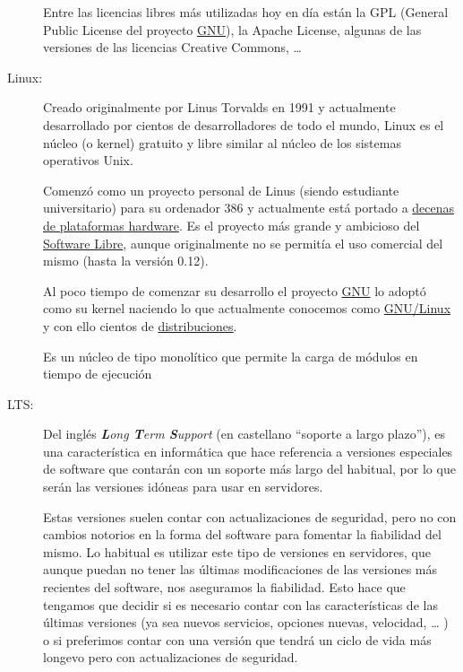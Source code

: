 \begin{description}
    Entre las licencias libres más utilizadas hoy en día están la GPL (General Public License del proyecto \hyperlink{gnu}{GNU}), la Apache License, algunas de las versiones de las licencias Creative Commons, …


    \hypertarget{linux}{}
    \item[Linux:] Creado originalmente por Linus Torvalds en 1991 y actualmente desarrollado por cientos de desarrolladores de todo el mundo, Linux es el núcleo (o kernel) gratuito y libre similar al núcleo de los sistemas operativos Unix.

    Comenzó como un proyecto personal de Linus (siendo estudiante universitario) para su ordenador 386 y actualmente está portado a \href{https://es.wikipedia.org/wiki/Portabilidad\_del\_n\%C3\%BAcleo\_Linux\_y\_arquitecturas\_soportadas}{decenas de plataformas hardware}. Es el proyecto más grande y ambicioso del \hyperlink{software_libre}{Software Libre}, aunque originalmente no se permitía el uso comercial del mismo (hasta la versión 0.12).

    Al poco tiempo de comenzar su desarrollo el proyecto \hyperlink{gnu}{GNU} lo adoptó como su kernel naciendo lo que actualmente conocemos como \hyperlink{gnu_linux}{GNU/Linux} y con ello cientos de \hyperlink{distribucion_gnu_linux}{distribuciones}.

    Es un núcleo de tipo monolítico que permite la carga de módulos en tiempo de ejecución


    \hypertarget{lts}{}
    \item[LTS:] Del inglés \textit{\textbf{L}ong \textbf{T}erm \textbf{S}upport} (en castellano “soporte a largo plazo”), es una característica en informática que hace referencia a versiones especiales de software que contarán con un soporte más largo del habitual, por lo que serán las versiones idóneas para usar en servidores.

    Estas versiones suelen contar con actualizaciones de seguridad, pero no con cambios notorios en la forma del software para fomentar la fiabilidad del mismo. Lo habitual es utilizar este tipo de versiones en servidores, que aunque puedan no tener las últimas modificaciones de las versiones más recientes del software, nos aseguramos la fiabilidad. Esto hace que tengamos que decidir si es necesario contar con las características de las últimas versiones (ya sea nuevos servicios, opciones nuevas, velocidad, … ) o si preferimos contar con una versión que tendrá un ciclo de vida más longevo pero con actualizaciones de seguridad.


\end{description}
